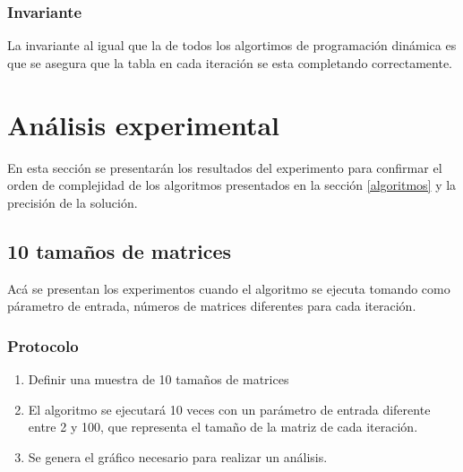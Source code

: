 \documentclass[letter]{article}
\begin{document}
\subsubsection{Invariante} \label{algoritmos:inocente:invariante}

La invariante al igual que la de todos los algortimos de programación dinámica es que se asegura que la tabla en cada iteración se esta completando correctamente.

\section{Análisis experimental} \label{experimentos}

En esta sección se presentarán los resultados del experimento para confirmar el orden de complejidad de los algoritmos presentados en la sección \ref{algoritmos} y la precisión de la solución. 

\newpage

\subsection{10 tamaños de matrices} \label{experimentos:aleatorias}

Acá se presentan los experimentos cuando el algoritmo se ejecuta tomando como párametro de entrada, números de matrices diferentes para cada iteración.

\subsubsection{Protocolo}
\begin{enumerate}
    \item Definir una muestra de 10 tamaños de matrices
    \item El algoritmo se ejecutará 10 veces con un parámetro de entrada diferente entre 2 y 100, que representa el tamaño de la matriz de cada iteración.
    \item Se genera el gráfico necesario para realizar un análisis.
\end{enumerate}
\end{document}
